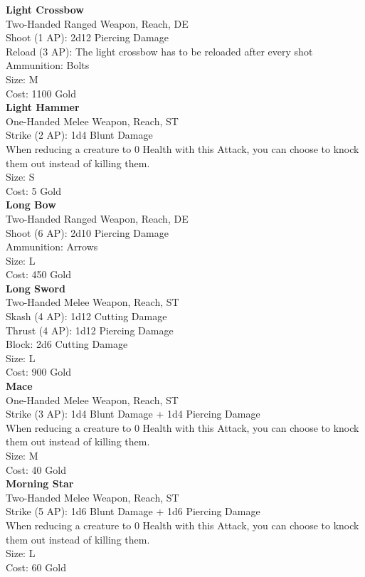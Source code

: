 \textbf{Light Crossbow}\\
Two-Handed Ranged Weapon,  Reach, DE\\
Shoot (1 AP): 2d12 Piercing Damage\\
Reload (3 AP): The light crossbow has to be reloaded after every shot\\
Ammunition: Bolts\\
Size: M\\
Cost: 1100 Gold\\


\textbf{Light Hammer}\\
One-Handed Melee Weapon,  Reach, ST\\
Strike (2 AP): 1d4 Blunt Damage\\
When reducing a creature to 0 Health with this Attack, you can choose to knock them out instead of killing them.\\
Size: S\\
Cost: 5 Gold\\


\textbf{Long Bow}\\
Two-Handed Ranged Weapon,  Reach, DE\\
Shoot (6 AP): 2d10 Piercing Damage\\
Ammunition: Arrows\\
Size: L\\
Cost: 450 Gold\\


\textbf{Long Sword}\\
Two-Handed Melee Weapon,  Reach, ST\\
Skash (4 AP): 1d12 Cutting Damage\\
Thrust (4 AP): 1d12 Piercing Damage\\
Block: 2d6 Cutting Damage\\
Size: L\\
Cost: 900 Gold\\


\textbf{Mace}\\
One-Handed Melee Weapon,  Reach, ST\\
Strike (3 AP): 1d4 Blunt Damage + 1d4 Piercing Damage\\
When reducing a creature to 0 Health with this Attack, you can choose to knock them out instead of killing them.\\
Size: M\\
Cost: 40 Gold\\


\textbf{Morning Star}\\
Two-Handed Melee Weapon,  Reach, ST\\
Strike (5 AP): 1d6 Blunt Damage + 1d6 Piercing Damage\\
When reducing a creature to 0 Health with this Attack, you can choose to knock them out instead of killing them.\\
Size: L\\
Cost: 60 Gold\\



